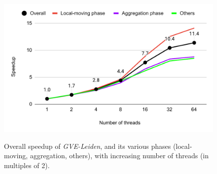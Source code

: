 \begin{figure}[hbtp]
  \centering
  \includegraphics[width=0.98\linewidth]{out/leiden-ss.pdf} \\[0ex]
  \caption{Overall speedup of \textit{GVE-Leiden}, and its various phases (local-moving, aggregation, others), with increasing number of threads (in multiples of 2).}
  \label{fig:leiden-ss}
\end{figure}
